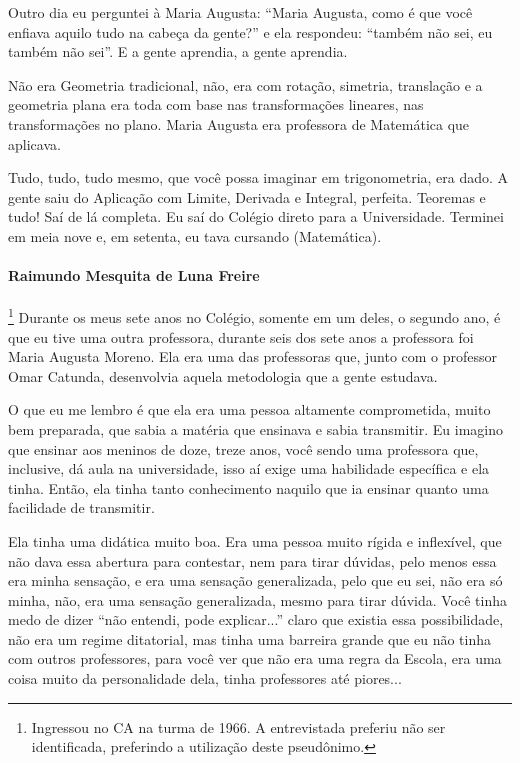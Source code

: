 \documentclass{hipatia}
\begin{document}
Outro dia eu perguntei à Maria Augusta: ``Maria Augusta, como é que você
enfiava aquilo tudo na cabeça da gente?'' e ela respondeu: ``também não
sei, eu também não sei''. E a gente aprendia, a gente aprendia.

Não era Geometria tradicional, não, era com rotação, simetria,
translação e a geometria plana era toda com base nas transformações
lineares, nas transformações no plano. Maria Augusta era professora de
Matemática que aplicava.

Tudo, tudo, tudo mesmo, que você possa imaginar em trigonometria, era
dado. A gente saiu do Aplicação com Limite, Derivada e Integral,
perfeita. Teoremas e tudo! Saí de lá completa. Eu saí do Colégio direto
para a Universidade. Terminei em meia nove e, em setenta, eu tava
cursando (Matemática).

\paragraph{Raimundo Mesquita de Luna Freire}\footnote{Ingressou no CA na
  turma de 1966. A entrevistada preferiu não ser identificada,
  preferindo a utilização deste pseudônimo.}
Durante os meus sete anos no Colégio, somente em um deles, o segundo
ano, é que eu tive uma outra professora, durante seis dos sete anos a
professora foi Maria Augusta Moreno. Ela era uma das professoras que,
junto com o professor Omar Catunda, desenvolvia aquela metodologia que a
gente estudava.

O que eu me lembro é que ela era uma pessoa altamente comprometida,
muito bem preparada, que sabia a matéria que ensinava e sabia
transmitir. Eu imagino que ensinar aos meninos de doze, treze anos, você
sendo uma professora que, inclusive, dá aula na universidade, isso aí
exige uma habilidade específica e ela tinha. Então, ela tinha tanto
conhecimento naquilo que ia ensinar quanto uma facilidade de transmitir.

Ela tinha uma didática muito boa. Era uma pessoa muito rígida e
inflexível, que não dava essa abertura para contestar, nem para tirar
dúvidas, pelo menos essa era minha sensação, e era uma sensação
generalizada, pelo que eu sei, não era só minha, não, era uma sensação
generalizada, mesmo para tirar dúvida. Você tinha medo de dizer ``não
entendi, pode explicar...'' claro que existia essa possibilidade, não
era um regime ditatorial, mas tinha uma barreira grande que eu não tinha
com outros professores, para você ver que não era uma regra da Escola,
era uma coisa muito da personalidade dela, tinha professores até
piores...
\end{document}
